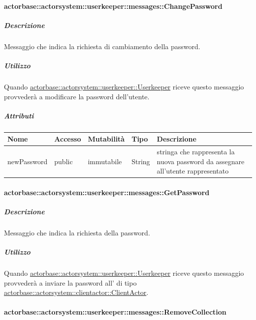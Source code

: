 \documentclass{scalatekids-article}
\begin{document}
\paragraph{actorbase::actorsystem::userkeeper::messages::ChangePassword}
\label{sec:actorbase::actorsystem::userkeeper::messages::ChangePassword}

\subparagraph{Descrizione}
Messaggio che indica la richiesta di cambiamento della password.

\subparagraph{Utilizzo}
Quando \hyperref[sec:actorbase::actorsystem::userkeeper::Userkeeper]{actorbase::\allowbreak{}actorsystem::\allowbreak{}userkeeper::\allowbreak{}Userkeeper}
riceve questo messaggio provvederà a modificare la password dell'utente.

\subparagraph{Attributi}
\begin{tabular}{| p{3cm} | p{1.5cm} | p{2cm} | p{2cm} | p{8.5cm} |}
  \hline
  Nome & Accesso & Mutabilità & Tipo & Descrizione\\
  \hline
  newPassword & public & immutabile & String & stringa che rappresenta la nuova password da assegnare all'utente rappresentato \\
  \hline
\end{tabular}


\paragraph{actorbase::actorsystem::userkeeper::messages::GetPassword}
\label{sec:actorbase::actorsystem::userkeeper::messages::GetPassword}

\subparagraph{Descrizione}

Messaggio che indica la richiesta della password.

\subparagraph{Utilizzo}

Quando \hyperref[sec:actorbase::actorsystem::userkeeper::Userkeeper]{actorbase::\allowbreak{}actorsystem::\allowbreak{}userkeeper::\allowbreak{}Userkeeper}
riceve questo messaggio provvederà a inviare la password all' di tipo
\hyperref[sec:actorbase::actorsystem::clientactor::ClientActor]{actorbase::\allowbreak{}actorsystem::\allowbreak{}clientactor::\allowbreak{}ClientActor}.

\paragraph{actorbase::actorsystem::userkeeper::messages::RemoveCollection}
\label{sec:actorbase::actorsystem::userkeeper::messages::RemoveCollection}
\end{document}
